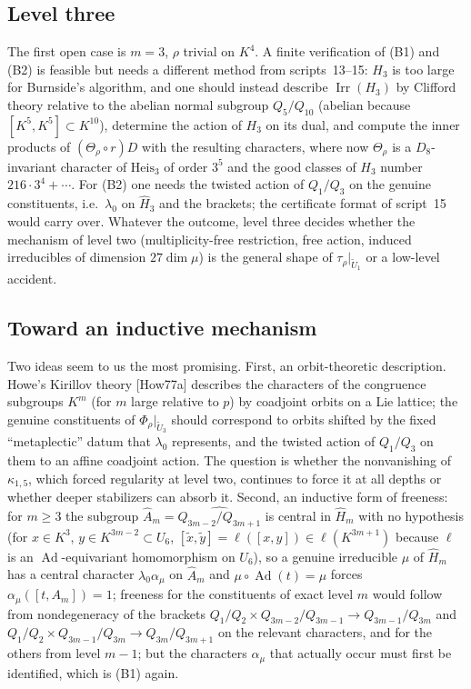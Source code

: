 \documentclass[11pt]{article}
\newcommand{\Irr}{\operatorname{Irr}}
\newcommand{\Ad}{\operatorname{Ad}}
\newcommand{\tU}{\widetilde U}
\theoremstyle{plain}
\theoremstyle{definition}
\begin{document}
\subsection{Level three}
The first open case is $m=3$, $\rho$ trivial on $K^4$.  A finite
verification of (B1) and (B2) is feasible but needs a different method
from scripts~13--15: $H_3$ is too large for Burnside's algorithm, and
one should instead describe $\Irr(H_3)$ by Clifford theory relative to
the abelian normal subgroup $Q_5/Q_{10}$ (abelian because
$[K^5,K^5]\subset K^{10}$), determine the action of $H_3$ on its dual,
and compute the inner products of $(\Theta_\rho\circ r)D$ with the
resulting characters, where now $\Theta_\rho$ is a $D_8$-invariant
character of $\mathrm{Heis}_3$ of order $3^5$ and the good classes of
$H_3$ number $216\cdot3^4+\cdots$.  For (B2) one needs the twisted
action of $Q_1/Q_3$ on the genuine constituents, i.e.\ $\lambda_0$ on
$\hat H_3$ and the brackets; the certificate format of script~15 would
carry over.  Whatever the outcome, level three decides whether the
mechanism of level two (multiplicity-free restriction, free action,
induced irreducibles of dimension $27\dim\mu$) is the general shape of
$\tau_\rho|_{\tU_1}$ or a low-level accident.

\subsection{Toward an inductive mechanism}
Two ideas seem to us the most promising.  First, an orbit-theoretic
description.  Howe's Kirillov theory [How77a] describes the characters
of the congruence subgroups $K^m$ (for $m$ large relative to $p$) by
coadjoint orbits on a Lie lattice; the genuine constituents of
$\Phi_\rho|_{\tU_3}$ should correspond to orbits shifted by the fixed
``metaplectic'' datum that $\lambda_0$ represents, and the twisted
action of $Q_1/Q_3$ on them to an affine coadjoint action.  The question
is whether the nonvanishing of $\kappa_{1,5}$, which forced regularity
at level two, continues to force it at all depths or whether deeper
stabilizers can absorb it.  Second, an inductive form of freeness: for
$m\ge3$ the subgroup $\hat A_m=\widehat{Q_{3m-2}/Q_{3m+1}}$ is central in
$\hat H_m$ with no hypothesis (for $x\in K^3$, $y\in K^{3m-2}\subset U_6$,
$[\tilde x,\tilde y]=\ell([x,y])\in\ell(K^{3m+1})$ because $\ell$ is an
$\Ad$-equivariant homomorphism on $U_6$), so a genuine irreducible
$\mu$ of $\hat H_m$ has a central character $\lambda_0\alpha_\mu$ on
$\hat A_m$ and $\mu\circ\Ad(t)=\mu$ forces $\alpha_\mu([t,A_m])=1$;
freeness for the constituents of exact level $m$ would follow from
nondegeneracy of the brackets $Q_1/Q_2\times Q_{3m-2}/Q_{3m-1}\to Q_{3m-1}/Q_{3m}$
and $Q_1/Q_2\times Q_{3m-1}/Q_{3m}\to Q_{3m}/Q_{3m+1}$ on the relevant
characters, and for the others from level $m-1$; but the characters
$\alpha_\mu$ that actually occur must first be identified, which is
(B1) again.
\end{document}
